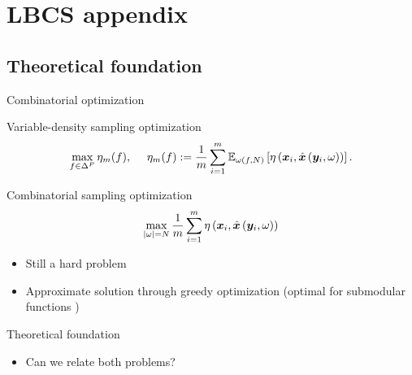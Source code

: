 \section{LBCS appendix}

\subsection{Theoretical foundation}
\begin{frame}{Combinatorial optimization}
\begin{block}{Variable-density sampling optimization}
$$\max_{f\in \Delta^P}  \eta_m (f), \text{~~~~} \eta_m (f) :=\frac{1}{m} \sum_{i=1}^m \mathbb{E}_{\omega(f,N)}\left[\eta\left({\bm{x}}_i, {\hat{{\bm{x}}}}\left({\bm{y}}_i, \omega\right)\right)\right].$$
\end{block}

\begin{block}{Combinatorial sampling optimization \parencite{gozcu2018learning}}
$$ \max_{|\omega|=N}  \frac{1}{m}\sum_{i=1}^m \eta\left({\bm{x}}_i, {\hat{{\bm{x}}}}\left({\bm{y}}_i, \omega\right)\right) $$
\end{block}
\pause
\begin{itemize}
\item Still a hard problem
\item Approximate solution through greedy optimization (optimal for submodular functions \parencite{minoux1978accelerated})
\end{itemize}

\end{frame}
\begin{frame}{Theoretical foundation}
\begin{itemize}
\item Can we relate both problems? \\

\end{itemize}
\end{frame}



